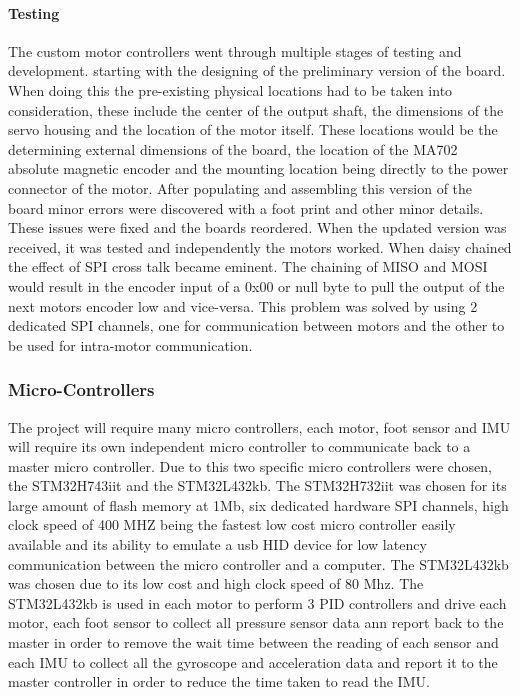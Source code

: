 \paragraph{Testing} 
The custom motor controllers went through multiple stages of testing and development. starting with the designing of the preliminary version of the board. When doing this the pre-existing physical locations had to be taken into consideration, these include the center of the output shaft, the dimensions of the servo housing and the location of the motor itself. These locations would be the determining external dimensions of the board, the location of the MA702 absolute magnetic encoder and the mounting location being directly to the power connector of the motor. After populating and assembling this version of the board minor errors were discovered with a foot print and other minor details. These issues were fixed and the boards reordered. When the updated version was received, it was tested and independently the motors worked. When daisy chained the effect of SPI cross talk became eminent. The chaining of MISO and MOSI would result in the encoder input of a 0x00 or null byte to pull the output of the next motors encoder low and vice-versa. This problem was solved by using 2 dedicated SPI channels, one for communication between motors and the other to be used for intra-motor communication. 

\subsubsection{Micro-Controllers}
    The project will require many micro controllers, each motor, foot sensor and IMU will require its own independent micro controller to communicate back to a master micro controller. Due to this two specific micro controllers were chosen, the STM32H743iit\cite{STM32H43IIT} and the STM32L432kb\cite{STM32l432KB}. The STM32H732iit was chosen for its large amount of flash memory at 1Mb, six dedicated hardware SPI channels, high clock speed of 400 MHZ being the fastest low cost micro controller easily available and its ability to emulate a usb HID device for low latency communication between the micro controller and a computer. The STM32L432kb was chosen due to its low cost and high clock speed of 80 Mhz. The STM32L432kb is used in each motor to perform 3 PID controllers and drive each motor, each foot sensor to collect all pressure sensor data ann report back to the master in order to remove the wait time between the reading of each sensor and each IMU to collect all the gyroscope and acceleration data and report it to the master controller in order to reduce the time taken to read the IMU. 
    
